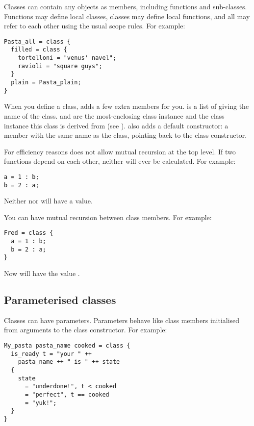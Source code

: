 Classes can contain any objects as members, including functions and
sub-classes. Functions may define local classes, classes may define local
functions, and all may refer to each other using the usual scope rules. For
example:

\begin{verbatim}
Pasta_all = class { 
  filled = class { 
    tortelloni = "venus' navel";
    ravioli = "square guys";
  }
  plain = Pasta_plain;
}
\end{verbatim}

When you define a class, \nip{} adds a few extra members for you. 
is a list of  giving the name of the class.  and
 are the most-enclosing class instance and the class instance
this class is derived from (see ). \nip{} also adds
a default constructor: a member with the same name as the class, pointing
back to the class constructor. 

For efficiency reasons \nip{} does not allow mutual recursion at the top
level. If two functions depend on each other, neither will ever be
calculated. For example:

\begin{verbatim}
a = 1 : b;
b = 2 : a;
\end{verbatim}

\noindent
Neither  nor  will have a value.

You can have mutual recursion between class members. For example:

\begin{verbatim}
Fred = class {
  a = 1 : b;
  b = 2 : a;
}
\end{verbatim}

\noindent
Now  will have the value \ct{[1, 2, 1, 2, 1, \ldots{}]}.

\subsection{Parameterised classes}

Classes can have parameters. Parameters behave like class members initialised
from arguments to the class constructor. For example:

\begin{verbatim}
My_pasta pasta_name cooked = class {
  is_ready t = "your " ++ 
    pasta_name ++ " is " ++ state
  {
    state
      = "underdone!", t < cooked
      = "perfect", t == cooked
      = "yuk!";
  }
}
\end{verbatim}

